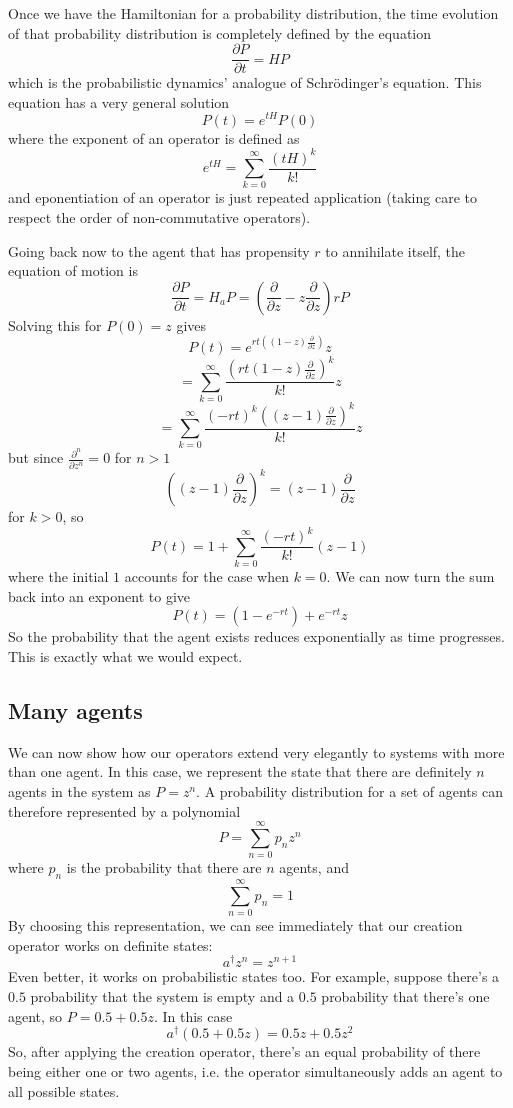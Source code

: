 \documentclass[letterpaper,twocolumn,10pt]{article}
\begin{document}
Once we have the Hamiltonian for a probability distribution, the time evolution of that probability distribution is completely defined by the equation
\[
\frac{\partial P}{\partial t} = HP
\]
which is the probabilistic dynamics' analogue of Schr\"{o}dinger's equation. This equation has a very general solution
\[
P(t) = e^{tH}P(0)
\]
where the exponent of an operator is defined as
\[
e^{tH} = \sum_{k=0}^\infty \frac{(tH)^k}{k!}
\]
and eponentiation of an operator is just repeated application (taking care to respect the order of non-commutative operators).

Going back now to the agent that has propensity $r$ to annihilate itself, the equation of motion is
\[
\frac{\partial P}{\partial t} = H_aP = \left(\frac{\partial }{\partial z} - z\frac{\partial }{\partial z}\right)rP
\]
Solving this for $P(0) = z$ gives
\[
P(t) = e^{rt((1-z)\frac{\partial}{\partial z})}z
\]
\[
 = \sum_{k=0}^\infty \frac{\left(rt(1-z)\frac{\partial}{\partial z}\right)^k}{k!}z
\]
\[
= \sum_{k=0}^\infty \frac{(-rt)^k\left((z-1)\frac{\partial}{\partial z}\right)^k}{k!}z
\]
but since $\frac{\partial^n}{\partial z^n} = 0$ for $n>1$
\[
\left((z-1)\frac{\partial}{\partial z}\right)^k = (z-1)\frac{\partial}{\partial z}
\]
for $k>0$, so
\[
P(t) = 1 + \sum_{k=0}^\infty \frac{(-rt)^k}{k!}(z-1)
\]
where the initial $1$ accounts for the case when $k=0$. We can now turn the sum back into an exponent to give
\[
P(t) = (1 - e^{-rt}) + e^{-rt}z
\]
So the probability that the agent exists reduces exponentially as time progresses. This is exactly what we would expect.

\subsection{Many agents}

We can now show how our operators extend very elegantly to systems with more than one agent. In this case, we represent the state that there are definitely $n$ agents in the system as $P = z^n$. A probability distribution for a set of agents can therefore represented by a polynomial
\[
P = \sum_{n=0}^\infty p_n z^n
\]
where $p_n$ is the probability that there are $n$ agents, and
\[
\sum_{n=0}^\infty p_n = 1
\]
By choosing this representation, we can see immediately that our creation operator works on definite states:
\[
a^\dag z^n = z^{n+1}
\]
Even better, it works on probabilistic states too. For example, suppose there's a $0.5$ probability that the system is empty and a $0.5$ probability that there's one agent, so $P = 0.5 + 0.5z$. In this case
\[
a^\dag (0.5 + 0.5z) = 0.5z + 0.5z^2
\]
So, after applying the creation operator, there's an equal probability of there being either one or two agents, i.e. the operator simultaneously adds an agent to all possible states.
\end{document}
